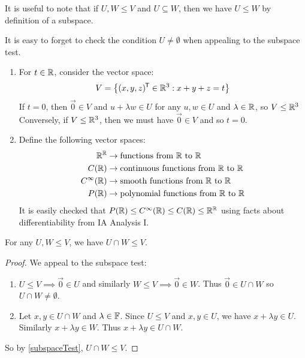 \documentclass[../main.tex]{subfiles}
\begin{document}
\begin{remark}
  It is useful to note that if $U, W \leq V$ and $U \subseteq W$, then we have $U \leq W$ by definition of a subspace.
\end{remark}
\begin{remark}[Warning]
  It is easy to forget to check the condition $U \neq \emptyset$ when appealing to the subspace test.
\end{remark}
\begin{example}
  \begin{enumerate}
    \item For $t \in \mathbb{R}$, consider the vector space:
      \[
        V = \left\{(x, y, z)^{{\mkern-1.5mu\mathsf{T}}} \in \mathbb{R}^3: x + y + z = t\right\}
      \]
      If $t = 0$, then $\vec{0} \in V$ and $u + \lambda w \in U$ for any $u, w \in U$ and $\lambda \in \mathbb{R}$, so $V \leq \mathbb{R}^3$
      Conversely, if $V \leq \mathbb{R}^3$, then we must have $\vec{0} \in V$ and so $t = 0$.
    \item Define the following vector spaces:
      \begin{align*}
        \mathbb{R}^{\mathbb{R}} &\to \text{functions from $\mathbb{R}$ to $\mathbb{R}$} \\
        C(\mathbb{R}) &\to \text{continuous functions from $\mathbb{R}$ to $\mathbb{R}$} \\
        C^{\infty}(\mathbb{R}) &\to \text{smooth functions from $\mathbb{R}$ to $\mathbb{R}$} \\
        P(\mathbb{R}) &\to \text{polynomial functions from $\mathbb{R}$ to $\mathbb{R}$}
      \end{align*}
      It is easily checked that $P(\mathbb{R}) \leq C^{\infty}(\mathbb{R}) \leq C(\mathbb{R}) \leq \mathbb{R}^{\mathbb{R}}$ using facts about differentiability from IA Analysis I.
  \end{enumerate}
\end{example}
\begin{proposition}
  For any $U, W \leq V$, we have $U \cap W \leq V$.
\end{proposition}
\begin{proof}
  We appeal to the subspace test:
  \begin{enumerate}
    \item $U \leq V \implies \vec{0} \in U$ and similarly $W \leq V \implies \vec{0} \in W$.
      Thus $\vec{0} \in U \cap W$ so $U \cap W \neq \emptyset$.
    \item Let $x, y \in U \cap W$ and $\lambda \in \mathbb{F}$.
      Since $U \leq V$ and $x, y \in U$, we have $x + \lambda y \in U$.
      Similarly $x + \lambda y \in W$.
      Thus $x + \lambda y \in U \cap W$.
  \end{enumerate}
  So by \cref{subspaceTest}, $U \cap W \leq V$.
\end{proof}
\end{document}

